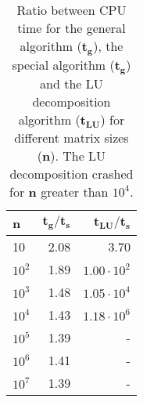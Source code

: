 \begin{table}[htbp]
	\centering
	\begin{tabular}{lrr}
		\textbf{n} & $\mathbf{{t_g}/{t_s}}$ & $\mathbf{{t_{LU}}/{t_s}}$  \\
		\midrule
		\addlinespace[0.1cm]

		10         & 2.08                                                                                          & 3.70                                                                                        \\
		$10^2$       & 1.89                                                                                          & $1.00\cdot 10^2 $                                                                                         \\
		$10^3$       & 1.48                                                                                          & $1.05 \cdot 10^4 $                                                                                        \\
		$10^4$       & 1.43                                                                                          & $1.18 \cdot 10^6$                                                                                         \\
		$10^5$       & 1.39                                                                                          & -                                                                                         \\
		$10^6$       & 1.41                                                                                          & -                                                                                        \\
		$10^7$       & 1.39                                                                                          &    -
	\end{tabular}  \caption{Ratio between CPU time for the general algorithm ($\mathbf{t_g}$), the special algorithm ($\mathbf{t_g}$) and the LU decomposition algorithm ($\mathbf{t_{LU}}$) for different matrix sizes (\textbf{n}). The LU decomposition crashed for \textbf{n} greater than $10^4$.} \label{table:time}
\end{table}
